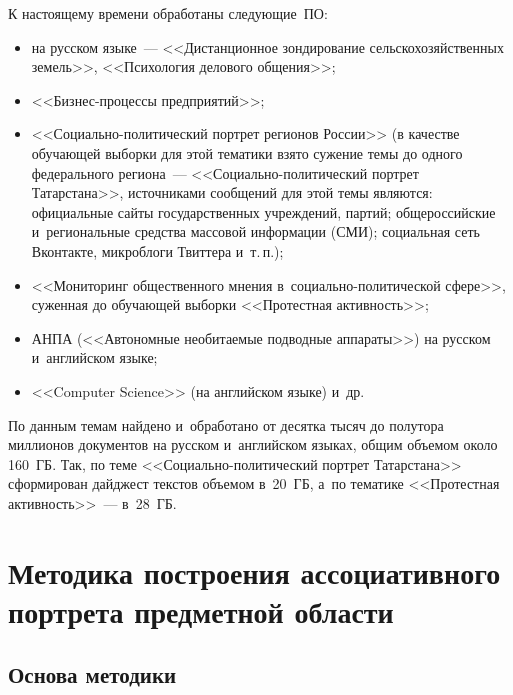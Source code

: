 \begin{multicols}{2}
     К настоящему времени обработаны следу\-ющие~ПО:
     \begin{itemize}
     \item на русском
языке~--- <<Дистанционное зондирование сельскохозяйственных земель>>,
<<Психология делового общения>>;\\[-13.5pt]
\item <<Биз\-нес-про\-цес\-сы
предприятий>>;\\[-13.5pt]
\item <<Со\-ци\-аль\-но-политический портрет регионов России>>
(в качестве обучающей выборки для этой тематики взято сужение темы до
одного федерального региона~--- <<Со\-ци\-аль\-но-по\-ли\-тический
портрет Татарстана>>, источниками сообщений для этой темы являются:
официальные сайты государственных учреждений, партий; общероссийские
и~региональные средства массовой информации (СМИ); социальная сеть Вконтакте, микроблоги Твиттера
и~т.\,п.);\\[-13.5pt]
\item <<Мониторинг общественного мнения в~со\-ци\-аль\-но-политической
сфере>>, суженная до обучающей выборки <<Протестная активность>>;\\[-13.5pt]
 \item  АНПА (<<Автономные необитаемые подводные аппараты>>) на
русском и~английском языке;\\[-13.5pt]
\item <<Computer Science>> (на английском языке)
и~др.
\end{itemize}

     По данным темам найдено и~обработано от десятка тысяч до полутора
миллионов документов на русском и~английском языках, общим объемом
около 160~ГБ. Так, по теме <<Со\-ци\-аль\-но-по\-ли\-ти\-че\-ский портрет
Татарстана>> сформирован дайджест текстов объемом в~20~ГБ, а~по
тематике <<Протестная активность>>~--- в~28~ГБ.

\vspace*{-6pt}

    \section{Методика построения ассоциативного портрета предметной области}

    \vspace*{-1pt}

     \subsection{Основа методики}


\end{multicols}
